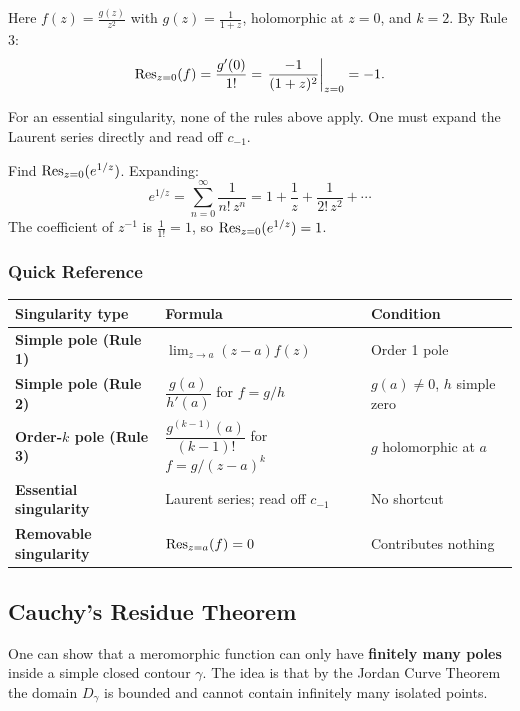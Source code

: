 \documentclass[11pt, a4paper]{article}
\begin{document}
\begin{exbox}[Rule 3 --- Find $\Res_{z=0}\!\left(\frac{1}{z^2(1+z)}\right)$]
Here $f(z)=\frac{g(z)}{z^2}$ with $g(z)=\frac{1}{1+z}$, holomorphic at $z=0$, and $k=2$. By Rule 3:
\[
  \operatorname{Res}_{z=0}(f) = \frac{g'(0)}{1!} = \left.\frac{-1}{(1+z)^2}\right|_{z=0} = -1.
\]
\end{exbox}

\begin{exbox}
For an essential singularity, none of the rules above apply. One must expand the Laurent series directly and read off $c_{-1}$.

Find $\operatorname{Res}_{z=0}(e^{1/z})$. Expanding:
\[
  e^{1/z} = \sum_{n=0}^\infty\frac{1}{n!\,z^n} = 1 + \frac{1}{z} + \frac{1}{2!\,z^2} + \cdots
\]
The coefficient of $z^{-1}$ is $\frac{1}{1!}=1$, so $\operatorname{Res}_{z=0}(e^{1/z})=1$.
\end{exbox}

\subsubsection*{Quick Reference}

\begin{center}
\renewcommand{\arraystretch}{2.0}
\begin{tabular}{>{\bfseries}p{3.6cm} p{6.8cm} p{3cm}}
\toprule
Singularity type & Formula & Condition \\
\midrule
Simple pole (Rule 1) & $\displaystyle\lim_{z\to a}(z-a)f(z)$ & Order 1 pole \\
Simple pole (Rule 2) & $\dfrac{g(a)}{h'(a)}$ for $f=g/h$ & $g(a)\neq 0$, $h$ simple zero \\
Order-$k$ pole (Rule 3) & $\dfrac{g^{(k-1)}(a)}{(k-1)!}$ for $f=g/(z-a)^k$ & $g$ holomorphic at $a$ \\
Essential singularity & Laurent series; read off $c_{-1}$ & No shortcut \\
Removable singularity & $\operatorname{Res}_{z=a}(f)=0$ & Contributes nothing \\
\bottomrule
\end{tabular}
\end{center}

\subsection*{Cauchy's Residue Theorem}

\begin{warnbox}[Remark 11.4]
One can show that a meromorphic function can only have \textbf{finitely many poles} inside a simple closed contour $\gamma$. The idea is that by the Jordan Curve Theorem the domain $D_\gamma$ is bounded and cannot contain infinitely many isolated points.
\end{warnbox}
\end{document}
